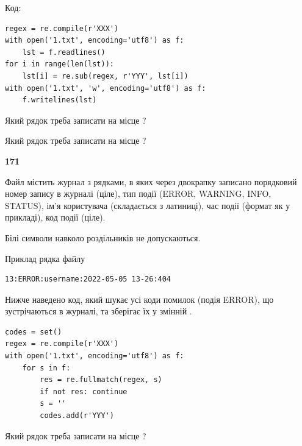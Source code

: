 Код:



\begin{verbatim}
regex = re.compile(r'XXX')
with open('1.txt', encoding='utf8') as f:
    lst = f.readlines()
for i in range(len(lst)):
    lst[i] = re.sub(regex, r'YYY', lst[i])
with open('1.txt', 'w', encoding='utf8') as f:
    f.writelines(lst)
\end{verbatim}









Який рядок треба записати на місце  ?\par
\vspace{5mm}


Який рядок треба записати на місце  ?\par


\newpage

{\begin {center}\textbf{ 171}\end {center}}\par
Файл  містить журнал з рядками, в яких через двокрапку записано поряд\-ко\-вий номер запису в журналі (ціле), тип події (ERROR, WARNING, INFO, STATUS), ім'я користувача (складається з латиниці), час події (фор\-мат як у прикладі), код події (ціле).

Білі символи навколо роздільників не допускаються.

Приклад рядка файлу



\begin{verbatim}
13:ERROR:username:2022-05-05 13-26:404
\end{verbatim}


Нижче наведено код, який шукає усі коди помилок (подія ERROR), що зустріча\-ють\-ся в журналі, та зберігає їх у змінній .



\begin{verbatim}
codes = set()
regex = re.compile(r'XXX')
with open('1.txt', encoding='utf8') as f:
    for s in f:
        res = re.fullmatch(regex, s)
        if not res: continue
        s = ''
        codes.add(r'YYY')
\end{verbatim}





Який рядок треба записати на місце  ?\par
\vspace{5mm}


